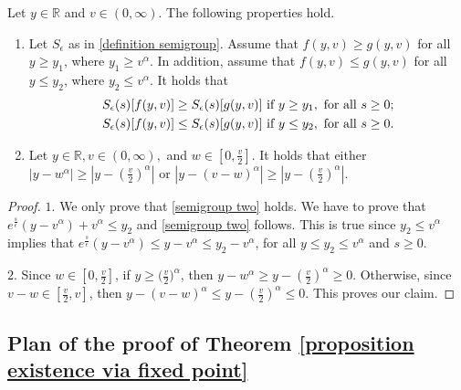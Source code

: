\documentclass[11pt]{article}
\numberwithin{equation}{section}
\begin{document}
\begin{lem} \label{properties of semigroup lemma}Let $y\in\mathbb{R}$ and $v\in(0,\infty)$. The following properties hold.
\begin{enumerate}
\item Let $S_{\epsilon}$ as in \eqref{definition semigroup}. Assume that $f(y,v)\geq  g(y,v)$ for all $y\geq y_{1}$, where $y_{1}\geq v^{\alpha}$. In addition, assume that $f(y,v)\leq  g(y,v)$ for all $y\leq y_{2}$, where $y_{2}\leq v^{\alpha}$. It holds that
\begin{align}
    S_{\epsilon}(s)[f(y,v)]&\geq S_{\epsilon}(s)[g(y,v)] \textup{ if } y\geq y_{1}, \textup{ for all } s\geq 0;\label{semigroup one}\\
      S_{\epsilon}(s)[f(y,v)]&\leq S_{\epsilon}(s)[g(y,v)] \textup{ if } y\leq y_{2}, \textup{ for all } s\geq 0.\label{semigroup two}
\end{align} 
\item Let $y\in\mathbb{R}, v\in(0,\infty),$ and $w\in[0,\frac{v}{2}]$. It holds that either $|y-w^{\alpha}|\geq |y-(\frac{v}{2})^{\alpha}|$ or  $|y-(v-w)^{\alpha}|\geq |y-(\frac{v}{2})^{\alpha}|$.
\end{enumerate}
\end{lem}
\begin{proof}
$1.$ We only prove that  \eqref{semigroup two} holds. We have to prove that $e^{\frac{s}{\epsilon}}(y-v^{\alpha})+v^{\alpha}\leq y_{2}$ and \eqref{semigroup two} follows. This is true since $y_{2}\leq v^{\alpha}$ implies that  $e^{\frac{s}{\epsilon}}(y-v^{\alpha})\leq y-v^{\alpha}\leq y_{2}-v^{\alpha}$, for all $y\leq y_{2}\leq v^{\alpha}$ and $s\geq 0$.


$2.$  Since $w\in[0,\frac{v}{2}]$, if $y\geq \big(\frac{v}{2}\big)^{\alpha}$, then $y-w^{\alpha}\geq y-(\frac{v}{2})^{\alpha}\geq 0$. Otherwise, since $v-w\in[\frac{v}{2},v]$, then $y-(v-w)^{\alpha}\leq y-(\frac{v}{2})^{\alpha}\leq 0$. This proves our claim.
\end{proof}

\subsection{Plan of the proof of Theorem \ref{proposition existence via fixed point}}
\end{document}
